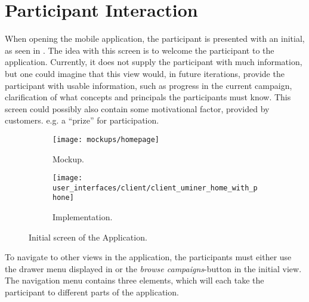
\section{Participant Interaction}
When opening the mobile application, the participant is presented with an initial, as seen in . The idea with this screen is to welcome the participant to the application. Currently, it does not supply the participant with much information, but one could imagine that this view would, in future iterations, provide the participant with usable information, such as progress in the current campaign, clarification of what concepts and principals the participants must know. This screen could possibly also contain some motivational factor, provided by customers. e.g. a ``prize'' for participation.



\begin{figure}[!htbp]
\begin{subfigure}[!t]{.48\textwidth}
  \centering
  \texttt{[image: mockups/homepage]}
  \caption{Mockup.}
  \label{fig:mockup_initial_screen}
\end{subfigure}%
\begin{subfigure}[!t]{.52\textwidth}
  \centering
  \texttt{[image: user\_interfaces/client/client\_uminer\_home\_with\_phone]}
  \caption{Implementation.}
  \label{fig:implementation_initial_screen}
\end{subfigure}
\caption{Initial screen of the Application.}
\label{fig:initial_screen}
\end{figure}
\FloatBarrier

To navigate to other views in the application, the participants must either use the drawer menu displayed in  or the \emph{browse campaigns}-button in the initial view. The navigation menu contains three elements, which will each take the participant to different parts of the application.


